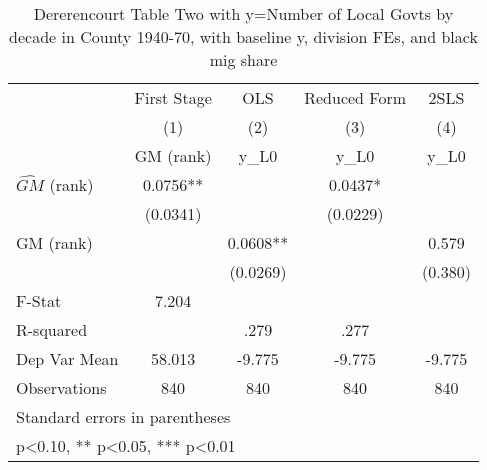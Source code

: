 \begin{table}[htbp]\centering
\def\sym#1{\ifmmode^{#1}\else\(^{#1}\)\fi}
\caption{Dererencourt Table Two with y=Number of Local Govts by decade in County 1940-70, with baseline y, division FEs, and black mig share}
\begin{tabular}{l*{4}{c}}
\toprule
                    & First Stage   &         OLS   &Reduced Form   &        2SLS   \\
                    &\multicolumn{1}{c}{(1)}&\multicolumn{1}{c}{(2)}&\multicolumn{1}{c}{(3)}&\multicolumn{1}{c}{(4)}\\
                    &\multicolumn{1}{c}{GM  (rank)}&\multicolumn{1}{c}{y\_L0}&\multicolumn{1}{c}{y\_L0}&\multicolumn{1}{c}{y\_L0}\\
\midrule
$\hat{GM}$ (rank)   &      0.0756** &               &      0.0437*  &               \\
                    &    (0.0341)   &               &    (0.0229)   &               \\
\addlinespace
GM  (rank)          &               &      0.0608** &               &       0.579   \\
                    &               &    (0.0269)   &               &     (0.380)   \\
\midrule
F-Stat              &       7.204   &               &               &               \\
R-squared           &               &        .279   &        .277   &               \\
Dep Var Mean        &      58.013   &      -9.775   &      -9.775   &      -9.775   \\
Observations        &         840   &         840   &         840   &         840   \\
\bottomrule
\multicolumn{5}{l}{\footnotesize Standard errors in parentheses}\\
\multicolumn{5}{l}{\footnotesize * p<0.10, ** p<0.05, *** p<0.01}\\
\end{tabular}
\end{table}
